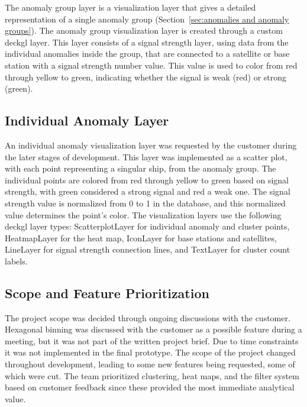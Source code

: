 The anomaly group layer is a visualization layer that gives a detailed representation of a single anomaly group (Section~\ref{sec:anomalies and anomaly groups}). The anomaly group visualization layer is created through a custom \gls{deckgl} layer. This layer consists of a signal strength layer, using data from the individual anomalies inside the group, that are connected to a satellite or base station with a signal strength number value. This value is used to color from red through yellow to green, indicating whether the signal is weak (red) or strong (green).

\subsection{Individual Anomaly Layer}

An individual anomaly visualization layer was requested by the customer during the later stages of development. This layer was implemented as a scatter plot, with each point representing a singular ship, from the anomaly group. The individual points are colored from red through yellow to green based on signal strength, with green considered a strong signal and red a weak one. The signal strength value is normalized from 0 to 1 in the database, and this normalized value determines the point's color.
The visualization layers use the following \gls{deckgl} layer types: ScatterplotLayer for individual anomaly and cluster points, HeatmapLayer for the heat map, IconLayer for base stations and satellites, LineLayer for signal strength connection lines, and TextLayer for cluster count labels.

\subsection{Scope and Feature Prioritization}

The project scope was decided through ongoing discussions with the customer. Hexagonal binning was discussed with the customer as a possible feature during a meeting, but it was not part of the written project brief. Due to time constraints it was not implemented in the final prototype. The scope of the project changed throughout development, leading to some new features being requested, some of which were cut. The team prioritized clustering, heat maps, and the filter system based on customer feedback since these provided the most immediate analytical value.

